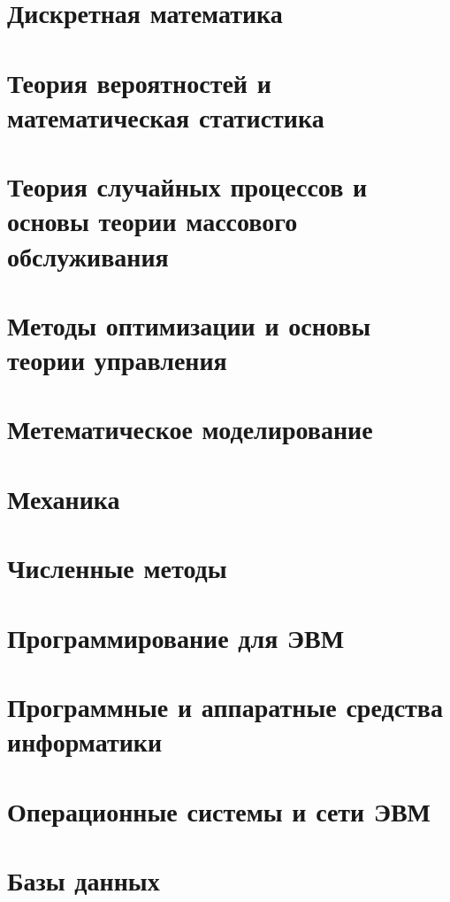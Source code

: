 \documentclass[12pt]{report}
\theoremstyle{definition}
\begin{document}

\chapter{Дискретная математика}

\chapter{Теория вероятностей и математическая статистика}

\chapter{Теория случайных процессов и основы теории массового обслуживания}

\chapter{Методы оптимизации и основы теории управления}

\chapter{Метематическое моделирование}

\chapter{Механика}

\chapter{Численные методы}

\chapter{Программирование для ЭВМ}

\chapter{Программные и аппаратные средства информатики}

\chapter{Операционные системы и сети ЭВМ}

\chapter{Базы данных}
\end{document}
